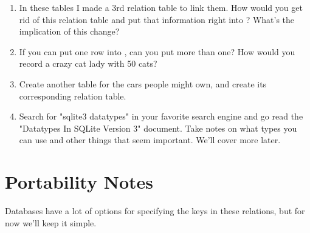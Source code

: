 \begin{enumerate}
\item In these tables I made a 3rd relation table to link them.  How would you
    get rid of this relation table  and put that
    information right into ?  What's the implication of this
    change?
\item If you can put one row into , can you put more than
    one?  How would you record a crazy cat lady with 50 cats?
\item Create another table for the cars people might own, and create its
    corresponding relation table.
\item Search for "sqlite3 datatypes" in your favorite search engine and 
    go read the "Datatypes In SQLite Version 3" document.  Take notes on
    what types you can use and other things that seem important.  We'll
    cover more later.
\end{enumerate}

\section{Portability Notes}

Databases have a lot of options for specifying the keys in these relations,
but for now we'll keep it simple.

